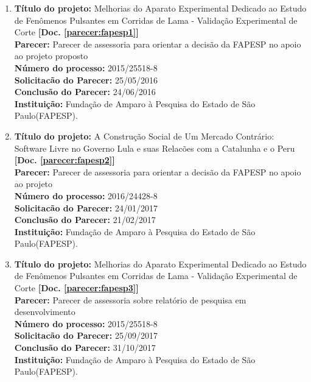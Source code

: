 \documentclass[a4paper,oneside,10pt]{article}
\begin{document}
\begin{enumerate}
\renewcommand{\labelenumi}{{\large\bfseries\arabic{enumi}.}}

\item \textbf{Título do projeto:} Melhorias do Aparato Experimental Dedicado ao Estudo de Fenômenos Pulsantes em Corridas de Lama - Validação Experimental de Corte \textbf{[Doc. \ref{parecer:fapesp1}]}\\
      \textbf{Parecer:} Parecer de assessoria para orientar a decisão da FAPESP no apoio ao projeto proposto\\
      \textbf{Número do processo:} 2015/25518-8\\
      \textbf{Solicitacão do Parecer:} 25/05/2016\\
      \textbf{Conclusão do Parecer:} 24/06/2016\\
      \textbf{Instituição:} Fundação de Amparo à Pesquisa do Estado de São Paulo(FAPESP).
      
\item \textbf{Título do projeto:} A Construção Social de Um Mercado Contrário: Software Livre no Governo Lula e suas Relacões com a Catalunha e o Peru \textbf{[Doc. \ref{parecer:fapesp2}]}\\
      \textbf{Parecer:} Parecer de assessoria para orientar a decisão da FAPESP no apoio ao projeto\\
      \textbf{Número do processo:} 2016/24428-8\\
      \textbf{Solicitacão do Parecer:} 24/01/2017\\
      \textbf{Conclusão do Parecer:} 21/02/2017\\
      \textbf{Instituição:} Fundação de Amparo à Pesquisa do Estado de São Paulo(FAPESP).
     
 \newpage 
 \item \textbf{Título do projeto:} Melhorias do Aparato Experimental Dedicado ao Estudo de Fenômenos Pulsantes em Corridas de Lama - Validação Experimental de Corte \textbf{[Doc. \ref{parecer:fapesp3}]}\\
      \textbf{Parecer:} Parecer de assessoria sobre relatório de pesquisa em desenvolvimento\\
      \textbf{Número do processo:} 2015/25518-8\\
      \textbf{Solicitacão do Parecer:} 25/09/2017\\
      \textbf{Conclusão do Parecer:} 31/10/2017\\
      \textbf{Instituição:} Fundação de Amparo à Pesquisa do Estado de São Paulo(FAPESP).  
     

\end{enumerate}
\end{document}
